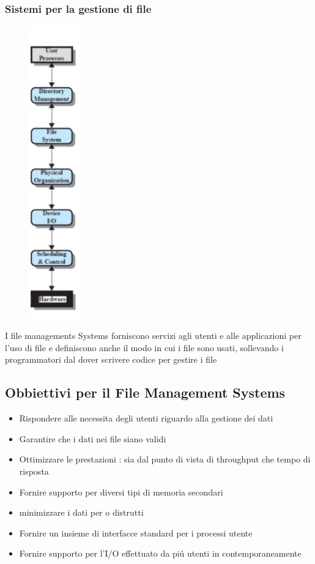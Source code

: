 \subsubsection*{Sistemi per la gestione di file}
    \begin{figure}[H]
    \centering
    \includegraphics[width=0.2\textwidth]{immagini/FileSystemIO}
\end{figure}
I file managements Systems forniscono servizi agli utenti e alle applicazioni per l'uso di file e definiscono anche il modo in cui i
file sono usati, sollevando i programmatori dal dover scrivere codice per gestire i file
\subsection{Obbiettivi per il File Management Systems}
\begin{itemize}
    \item Rispondere alle necessita degli utenti riguardo alla gestione dei dati
    \item Garantire che i dati nei file siano validi
    \item Ottimizzare le prestazioni : sia dal punto di vista di throughput che tempo di risposta
    \item Fornire supporto per diversi tipi di memoria secondari
    \item minimizzare i dati per o distrutti
    \item Fornire un insieme di interfacce standard per i processi utente
    \item Fornire supporto per l'I/O effettuato da piú utenti in contemporaneamente
\end{itemize}
